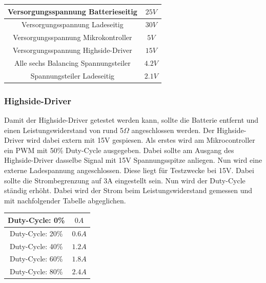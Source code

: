 \begin{center}
	\begin{tabular}{|c|c|}
		\hline 
		Versorgungsspannung Batterieseitig & $25V$ \\ \hline
		Versorgungsspannung Ladeseitig & $30V$ \\ \hline
		Versorgungsspannung Mikrokontroller & $5V$ \\ \hline
		Versorgungsspannung Highside-Driver & $15V$ \\ \hline
		Alle sechs Balancing Spannungsteiler & $4.2V$ \\ \hline
		Spannungsteiler Ladeseitig & $2.1V$ \\ \hline
		
	\end{tabular} 
	\label{tab:Spannungsmessungen}
\end{center}

\subsubsection*{Highside-Driver}
\label{Highside-Driver}
Damit der Highside-Driver getestet werden kann, sollte die Batterie entfernt und einen Leistungswiderstand von rund 5$\Omega$ angeschlossen werden. Der Highside-Driver wird dabei extern mit 15V gespiesen. Als erstes wird am Mikrocontroller ein PWM mit 50\% Duty-Cycle ausgegeben. Dabei sollte am Ausgang des Highside-Driver dasselbe Signal mit 15V Spannungsspitze anliegen. Nun wird eine externe Ladespannung angeschlossen. Diese liegt für Testzwecke bei 15V. Dabei sollte die Strombegrenzung auf 3A eingestellt sein. Nun wird der Duty-Cycle ständig erhöht. Dabei wird der Strom beim Leistungswiderstand gemessen und mit nachfolgender Tabelle abgeglichen.

\begin{center}
	\begin{tabular}{|c|c|}
		\hline 
		Duty-Cycle: 0\% & $0A$ \\ \hline
		Duty-Cycle: 20\% & $0.6A$ \\ \hline
		Duty-Cycle: 40\% & $1.2A$ \\ \hline
		Duty-Cycle: 60\% & $1.8A$ \\ \hline
		Duty-Cycle: 80\% & $2.4A$ \\ \hline
	\end{tabular} 
	\label{tab:LadestromHighsideDriver}
\end{center}

